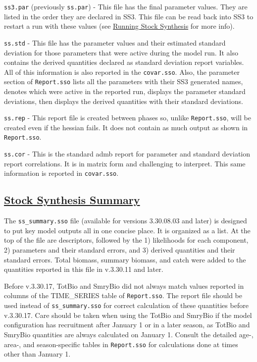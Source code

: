 \texttt{ss3.par} (previously \texttt{ss.par}) - This file has the final parameter values. They are listed in the order they are declared in SS3. This file can be read back into SS3 to restart a run with these values (see \hyperref[sec:RunningSS3]{Running Stock Synthesis} for more info).

\texttt{ss.std} - This file has the parameter values and their estimated standard deviation for those parameters that were active during the model run. It also contains the derived quantities declared as standard deviation report variables. All of this information is also reported in the \texttt{covar.sso}. Also, the parameter section of \texttt{Report.sso} lists all the parameters with their SS3 generated names, denotes which were active in the reported run, displays the parameter standard deviations, then displays the derived quantities with their standard deviations.

\texttt{ss.rep} - This report file is created between phases so, unlike \texttt{Report.sso}, will be created even if the hessian fails. It does not contain as much output as shown in \texttt{Report.sso}.

\texttt{ss.cor} - This is the standard \gls{admb} report for parameter and standard deviation report correlations. It is in matrix form and challenging to interpret. This same information is reported in \texttt{covar.sso}.

\hypertarget{SS3Summary}{}
\subsection[Stock Synthesis Summary]{\protect\hyperlink{SS3Summary}{Stock Synthesis Summary}}
The \texttt{ss\_summary.sso} file (available for versions 3.30.08.03 and later) is designed to put key model outputs all in one concise place. It is organized as a list. At the top of the file are descriptors, followed by the 1) likelihoods for each component, 2) parameters and their standard errors, and 3) derived quantities and their standard errors. Total biomass, summary biomass, and catch were added to the quantities reported in this file in v.3.30.11 and later.

Before v.3.30.17, TotBio and SmryBio did not always match values reported in columns of the TIME\_SERIES table of \texttt{Report.sso}. The report file should be used instead of \texttt{ss\_summary.sso} for correct calculation of these quantities before v.3.30.17. Care should be taken when using the TotBio and SmryBio if the model configuration has recruitment after January 1 or in a later season, as TotBio and SmryBio quantities are always calculated on January 1. Consult the detailed age-, area-, and season-specific tables in \texttt{Report.sso} for calculations done at times other than January 1.

